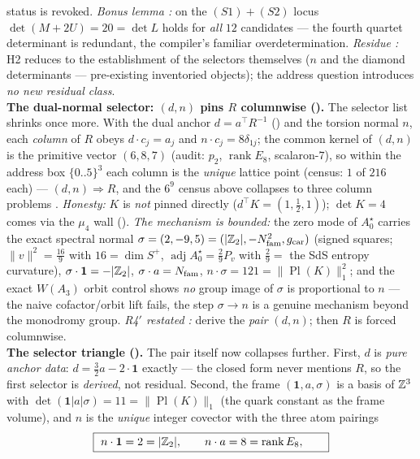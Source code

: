 \begin{keybox}
status is revoked. \emph{Bonus lemma \mE:} on the $(S1)+(S2)$ locus $\det(M+2U)=20=\det L$ holds for
\emph{all} $12$ candidates --- the fourth quartet determinant is redundant, the compiler's familiar
overdetermination. \emph{Residue \mC:} H2 reduces to the establishment of the selectors themselves
($n$ and the diamond determinants --- pre-existing inventoried objects); the address question
introduces \emph{no new residual class}.
\smallskip\\
\noindent\textbf{The dual-normal selector: $(d,n)$ pins $R$ columnwise ().}
The selector list shrinks once more. With the dual anchor $d=a^\top R^{-1}$ ()
and the torsion normal $n$, each \emph{column} of $R$ obeys $d\cdot c_j=a_j$ and $n\cdot c_j=8\delta_{1j}$;
the common kernel of $(d,n)$ is the primitive vector $(6,8,7)$ (audit: $p_2$, $\operatorname{rank}E_8$,
scalaron-$7$), so within the address box $\{0..5\}^3$ each column is the \emph{unique} lattice point
(census: $1$ of $216$ each) --- $(d,n)\Rightarrow R$, and the $6^9$ census above collapses to three
column problems \mE. \emph{Honesty:} $K$ is \emph{not} pinned directly ($d^\top K=(1,\tfrac12,1)$); $\det
K=4$ comes via the $\mu_4$ wall (). \emph{The mechanism is bounded:} the zero
mode of $A_0^\star$ carries the exact spectral normal $\sigma=(2,-9,5)=(|\mathbb Z_2|,-N_{\mathrm{fam}}^2,g_{\mathrm{car}})$ (signed
squares; $\|v\|^2=\tfrac{16}9$ with $16=\dim S^+$, $\operatorname{adj}A_0^\star=\tfrac29P_v$ with
$\tfrac29=$ the SdS entropy curvature), $\sigma\cdot\mathbf 1=-|\mathbb Z_2|$, $\sigma\cdot a=N_{\mathrm{fam}}$,
$n\cdot\sigma=121=\|\operatorname{Pl}(K)\|_1^2$; and the exact $W(A_3)$ orbit control shows \emph{no}
group image of $\sigma$ is proportional to $n$ --- the naive cofactor/orbit lift fails, the step
$\sigma\to n$ is a genuine mechanism beyond the monodromy group. \emph{R4$'$ restated \mC:} derive the
\emph{pair} $(d,n)$; then $R$ is forced columnwise.
\smallskip\\
\noindent\textbf{The selector triangle ().} The pair itself now
collapses further. First, $d$ is \emph{pure anchor data}: $d=\tfrac32a-2\cdot\mathbf1$ exactly --- the
closed form never mentions $R$, so the first selector is \emph{derived}, not residual. Second, the frame
$(\mathbf1,a,\sigma)$ is a basis of $\mathbb Z^3$ with $\det(\mathbf1|a|\sigma)=11=\|\operatorname{Pl}(K)\|_1$
(the quark constant as the frame volume), and $n$ is the \emph{unique} integer covector with the three
atom pairings
\[
  \boxed{\ n\cdot\mathbf1=2=|\mathbb Z_2|,\qquad n\cdot a=8=\operatorname{rank}E_8,\qquad
}\]
\end{keybox}
